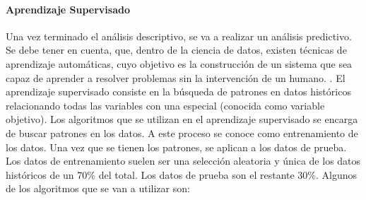 \documentclass[spanish,12pt, a4paper,twoside]{paper}
\begin{document}
\paragraph{Aprendizaje Supervisado}
\justify
Una vez terminado el análisis descriptivo, se va a realizar un análisis predictivo. Se debe tener en cuenta, que, dentro de la ciencia de datos, existen técnicas de aprendizaje automáticas, cuyo objetivo es la construcción de un sistema que sea capaz de aprender a resolver problemas sin la intervención de un humano. \cite{Marin2018}.
\justify
El aprendizaje supervisado consiste en la búsqueda de patrones en datos históricos relacionando todas las variables con una especial (conocida como variable objetivo). Los algoritmos que se utilizan en el aprendizaje supervisado se encarga de buscar patrones en los datos. A este proceso se conoce como entrenamiento de los datos. Una vez que se tienen los patrones, se aplican a los datos de prueba. Los datos de entrenamiento suelen ser una selección aleatoria y única de los datos históricos de un 70\% del total. Los datos de prueba son el restante 30\%. \cite{Manguart2017}
Algunos de los algoritmos que se van a utilizar son:
\end{document}
